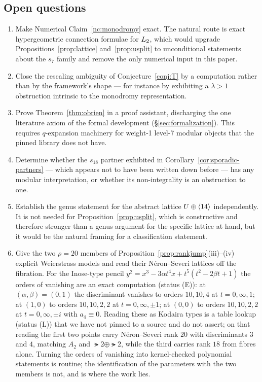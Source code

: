 \subsection{Open questions}

\begin{enumerate}
\item Make Numerical Claim~\ref{nc:monodromy} exact. The natural route is
  exact hypergeometric connection formulae for $L_2$, which would upgrade
  Propositions~\ref{prop:lattice} and~\ref{prop:usplit} to unconditional
  statements about the $s_7$ family and remove the only numerical input in
  this paper.
\item Close the rescaling ambiguity of Conjecture~\ref{conj:T} by a
  computation rather than by the framework's shape --- for instance by
  exhibiting a $\lambda>1$ obstruction intrinsic to the monodromy
  representation.
\item Prove Theorem~\ref{thm:obrien} in a proof assistant, discharging the one
  literature axiom of the formal development (\S\ref{sec:formalization}). This
  requires $q$-expansion machinery for weight-1 level-7 modular objects that
  the pinned library does not have.
\item Determine whether the $s_{18}$ partner exhibited in
  Corollary~\ref{cor:sporadic-partners} --- which appears not to have been
  written down before --- has any modular interpretation, or whether its
  non-integrality is an obstruction to one.
\item Establish the genus statement for the abstract lattice
  $U\oplus\langle 14\rangle$ independently. It is not needed for
  Proposition~\ref{prop:usplit}, which is constructive and therefore stronger
  than a genus argument for the specific lattice at hand, but it would be the
  natural framing for a classification statement.
\item Give the two $\rho=20$ members of Proposition~\ref{prop:rankjump}(iii)--(iv)
  explicit Weierstrass models and read their N\'eron--Severi lattices off the
  fibration. For the Inose-type pencil
  $y^2 = x^3 - 3\alpha t^4 x + t^5(t^2-2\beta t+1)$ the orders of vanishing are
  an exact computation (status (E)): at $(\alpha,\beta)=(0,1)$ the
  discriminant vanishes to orders $10,10,4$ at $t=0,\infty,1$; at $(1,0)$ to
  orders $10,10,2,2$ at $t=0,\infty,\pm1$; at $(0,0)$ to orders $10,10,2,2$ at
  $t=0,\infty,\pm i$ with $a_4\equiv0$. Reading these as Kodaira types is a
  table lookup (status (L)) that we have not pinned to a source and do not
  assert; on that reading the first two points carry N\'eron--Severi rank
  $20$ with discriminants $3$ and $4$, matching $A_2$ and $\lat2\oplus\lat2$,
  while the third carries rank $18$ from fibres alone. Turning the orders of
  vanishing into kernel-checked polynomial statements is routine; the
  identification of the parameters with the two members is not, and is where
  the work lies.
\end{enumerate}

